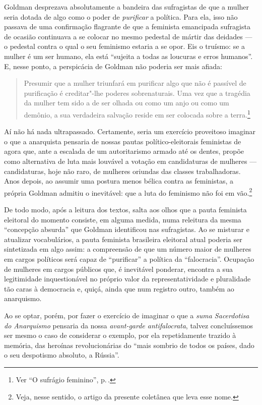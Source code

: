 Goldman desprezava absolutamente a
bandeira das sufragistas de que a mulher seria dotada de algo como o
poder de \textit{purificar} a política. Para ela, isso não passava de
uma confirmação flagrante de que a feminista emancipada sufragista de
ocasião continuava a se colocar no mesmo pedestal de mártir das deidades
--- o pedestal contra o qual o seu feminismo estaria a se
opor. Eis o truísmo: se a mulher é um ser humano, ela está ``sujeita a
todas as loucuras e erros humanos''. E, nesse ponto, a perspicácia de
Goldman não poderia ser mais afiada:

\begin{quote}
Presumir que a mulher triunfará em
purificar algo que não é passível de purificação é creditar"-lhe poderes
sobrenaturais. Uma vez que a tragédia da mulher tem sido a de ser olhada
ou como um anjo ou como um demônio, a sua verdadeira salvação reside em ser
colocada sobre a terra.\footnote{Ver ``O sufrágio feminino'', p.\,\pageref{purificar}.}
\end{quote}

Aí não há nada ultrapassado. Certamente, seria um exercício proveitoso
imaginar o que a anarquista pensaria de nossas pautas
político-eleitorais feministas de agora que, ante a escalada de um
autoritarismo armado até os dentes, propõe como alternativa de luta mais
louvável a votação em candidaturas de mulheres --- candidaturas,
hoje não raro, de mulheres oriundas das classes trabalhadoras.
Anos depois, ao assumir uma postura menos bélica contra as feministas, a
própria Goldman admitiu o inevitável: que a luta do feminismo não foi em
vão.\footnote{Veja, nesse sentido, o artigo da presente coletânea que leva esse
nome.}

De todo modo, após a leitura dos textos,
salta aos olhos que a pauta feminista eleitoral do
momento consiste, em alguma medida, numa releitura da mesma ``concepção
absurda'' que Goldman identificou nas sufragistas. Ao se misturar e
atualizar vocabulários, a pauta feminista brasileira eleitoral atual poderia ser sintetizada em algo assim: a compreensão de
que um número maior de mulheres em cargos políticos será capaz de
``purificar'' a política da ``falocracia''. Ocupação de mulheres em
cargos públicos que, é inevitável ponderar, encontra a sua legitimidade
inquestionável no próprio valor da representatividade e pluralidade tão
caras à democracia e, quiçá, ainda que num registro outro, também ao
anarquismo.

Ao se optar, porém, por fazer o exercício de imaginar o
que a \textit{suma Sacerdotisa do Anarquismo} pensaria da nossa
\emph{avant-garde antifalocrata}, talvez concluíssemos ser mesmo o
caso de considerar o exemplo, por ela repetidamente trazido à memória,
das heroínas revolucionárias do ``mais sombrio de todos os países, dado
o seu despotismo absoluto, a Rússia''. 

